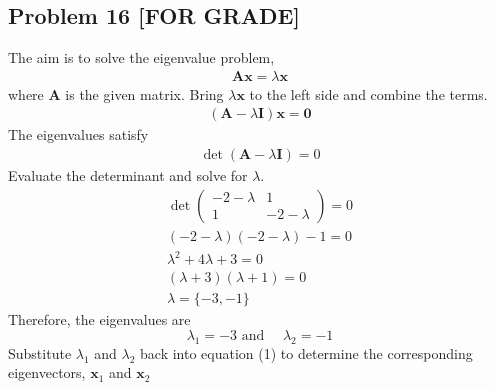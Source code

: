 \documentclass[12pt]{article}
\begin{document}
\subsection*{Problem 16 [FOR GRADE]}
\label{sec:orgc23eb0f}
   The aim is to solve the eigenvalue problem,
\begin{align*}
\mathbf{A} \mathbf{x}=\lambda \mathbf{x}
\end{align*}
where \(\mathbf{A}\) is the given matrix. Bring \(\lambda \mathbf{x}\) to the left side and combine the terms.
\begin{align*}
(\mathbf{A}-\lambda \mathbf{I}) \mathbf{x}=\mathbf{0}
\end{align*}
The eigenvalues satisfy
\begin{align*}
\operatorname{det}(\mathbf{A}-\lambda \mathbf{I})=0
\end{align*}
Evaluate the determinant and solve for \(\lambda\).
\begin{equation*}
	\begin{array}{c}
		\operatorname{det}\left(\begin{array}{cc}
				-2-\lambda & 1          \\
				1          & -2-\lambda
			\end{array}\right)=0 \\
		(-2-\lambda)(-2-\lambda)-1=0                               \\
		\lambda^{2}+4 \lambda+3=0                                  \\
		(\lambda+3)(\lambda+1)=0                                   \\
		\lambda=\{-3,-1\}
	\end{array}
\end{equation*}
Therefore, the eigenvalues are
\begin{equation*}
\lambda_{1}=-3 \text { and } \quad \lambda_{2}=-1
\end{equation*}
Substitute \(\lambda_{1}\) and \(\lambda_{2}\) back into equation (1) to determine
the corresponding eigenvectors, \(\mathbf{x}_{1}\) and \(\mathbf{x}_{2}\)
\end{document}
